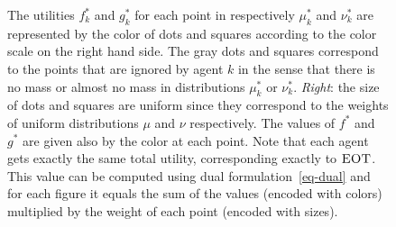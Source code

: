 \begin{figure}[t]
{The utilities $f_k^{*}$ and $g_k^{*}$ for each point in respectively $\mu_k^{*}$ and $\nu_k^{*}$ are represented by the color of dots and squares according to the color scale on the right hand side. The gray dots and squares correspond to the points that are ignored by agent $k$ in the sense that there is no mass or almost no mass in distributions $\mu^*_k$ or $\nu^*_k$. \emph{Right}: the size of dots and squares are uniform since they correspond to the weights of uniform distributions $\mu$ and $\nu$ respectively. The values of $f^*$ and $g^*$ are given also by the color at each point. Note that each agent gets exactly the same total utility, corresponding exactly to $\textsc{EOT}$. This value can be computed using dual formulation~\eqref{eq-dual} and for each figure it equals the sum of the values (encoded with colors) multiplied by the weight of each point (encoded with sizes).\label{fig:potential-dual}}
\end{figure}




